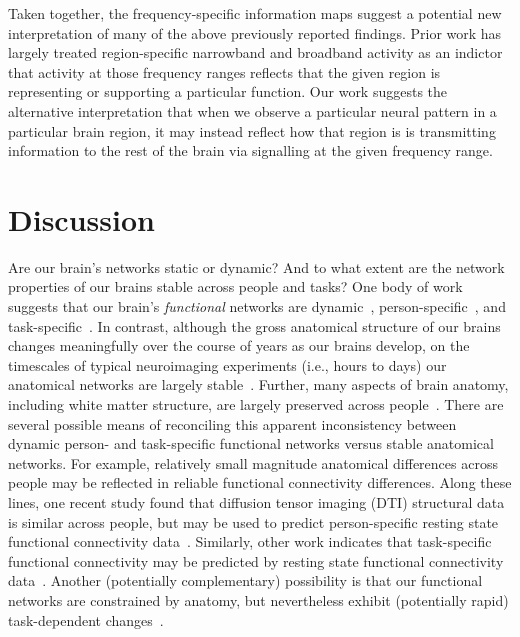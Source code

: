 \documentclass[11pt]{article}
\begin{document}
Taken together, the frequency-specific information maps suggest a potential new
interpretation of many of the above previously reported findings.  Prior work
has largely treated region-specific narrowband and broadband activity as an
indictor that activity at those frequency ranges reflects that the given region
is representing or supporting a particular function.  Our work suggests the
alternative interpretation that when we observe a particular neural pattern in a
particular brain region, it may instead reflect how that region is is
transmitting information to the rest of the brain via signalling at the given
frequency range.




\section*{Discussion}
Are our brain's networks static or dynamic?  And to what
extent are the network properties of our brains stable across people and tasks?
One body of work suggests that our brain's \textit{functional} networks are
dynamic~\citep[e.g., ][]{MannEtal18}, person-specific~\citep[e.g.,
][]{FinnEtal15}, and task-specific~\citep[e.g., ][]{Turk13}.  In contrast,
although the gross anatomical structure of our brains changes meaningfully over
the course of years as our brains develop, on the timescales of typical
neuroimaging experiments (i.e., hours to days) our anatomical networks are
largely stable~\citep[e.g., ][]{CaseEtal00}.  Further, many aspects of brain
anatomy, including white matter structure, are largely preserved across
people~\citep[e.g., ][]{TalaTour88, JahaEtal13, MoriEtal08}. There are several
possible means of reconciling this apparent inconsistency between dynamic
person- and task-specific functional networks versus stable anatomical networks.
For example, relatively small magnitude anatomical differences across people may
be reflected in reliable functional connectivity differences.  Along these
lines, one recent study found that diffusion tensor imaging (DTI) structural
data is similar across people, but may be used to predict person-specific
resting state functional connectivity data~\citep{BeckEtal18}.  Similarly, other
work indicates that task-specific functional connectivity may be predicted by
resting state functional connectivity data~\citep{ColeEtal16, TavoEtal16}.
Another (potentially complementary) possibility is that our functional networks
are constrained by anatomy, but nevertheless exhibit (potentially rapid)
task-dependent changes~\citep[e.g., ][]{SporBetz16}.
\end{document}
